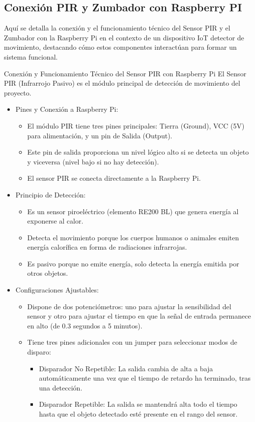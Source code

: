 \documentclass{report}
\begin{document}
\subsection{Conexión PIR y Zumbador con Raspberry PI}
Aquí se  detalla la conexión y el funcionamiento técnico del Sensor PIR y el Zumbador con la Raspberry Pi en el contexto de un dispositivo 
IoT detector de movimiento, destacando cómo estos componentes interactúan para formar un sistema funcional.

Conexión y Funcionamiento Técnico del Sensor PIR con Raspberry Pi
El Sensor PIR (Infrarrojo Pasivo) es el módulo principal de detección de movimiento del proyecto.
\begin{itemize}
    \item Pines y Conexión a Raspberry Pi:
    \begin{itemize}
        \item El módulo PIR tiene  tres pines principales: Tierra (Ground), VCC (5V) para alimentación, y un pin de Salida (Output).
        \item Este pin de salida proporciona un nivel lógico alto si se detecta un objeto y viceversa (nivel bajo si no hay detección).
        \item El sensor PIR se conecta directamente a la Raspberry Pi.
    \end{itemize}

    \item Principio de Detección:
    \begin{itemize}
        \item Es un sensor piroeléctrico (elemento RE200 BL) que genera energía al exponerse al calor.
        \item Detecta el movimiento porque los cuerpos humanos o animales emiten energía calorífica en forma de radiaciones infrarrojas.
        \item Es pasivo porque no emite energía, solo detecta la energía emitida por otros objetos.
    \end{itemize}

    \item Configuraciones Ajustables:
    \begin{itemize}
        \item Dispone de  dos potenciómetros: uno para ajustar la sensibilidad del sensor y otro para ajustar el tiempo en que la señal de entrada 
        permanece en alto (de 0.3 segundos a 5 minutos).
        \item Tiene tres pines adicionales con un jumper para seleccionar  modos de disparo:
        \begin{itemize}
            \item Disparador No Repetible: La salida cambia de alta a baja automáticamente una vez que el tiempo de retardo ha terminado, tras una detección.
            \item Disparador Repetible: La salida se mantendrá alta todo el tiempo hasta que el objeto detectado esté presente en el rango del sensor.
        \end{itemize}
    \end{itemize}


\end{itemize}
\end{document}
